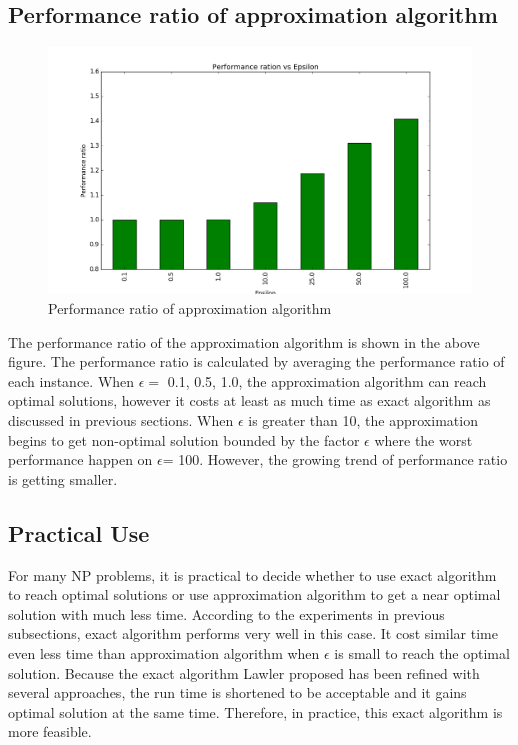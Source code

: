 \documentclass[11pt]{article}
\begin{document}
\subsection{Performance ratio of approximation algorithm}
\begin{figure}[H]
\hspace*{-1cm} 
    \label{fig:runtime} %
    \includegraphics[width=1.2\textwidth]{performance_ratio.png}
	\caption{Performance ratio of approximation algorithm}
\end{figure}
The performance ratio of the approximation algorithm is shown in the above figure. The performance ratio is calculated by averaging the performance ratio of each instance. When $\epsilon=$ 0.1, 0.5, 1.0, the approximation algorithm can reach optimal solutions, however it costs at least as much time as exact algorithm as discussed in previous sections.  When $\epsilon$ is greater than 10, the approximation begins to get non-optimal solution bounded by the factor $\epsilon$ where the worst performance happen on  $\epsilon$= 100. However, the growing trend of performance ratio is getting smaller.
\subsection{Practical Use}For many NP problems, it is practical to decide whether to use exact algorithm to reach  optimal solutions or use approximation algorithm to get a near optimal solution with much less time. According to the experiments in previous subsections, exact algorithm performs very well in this case. It cost similar time even less time than approximation algorithm when $\epsilon$ is small to reach the optimal solution. Because the exact algorithm Lawler proposed has been refined with several approaches, the run time is shortened to be acceptable and it gains optimal solution at the same time. Therefore, in practice, this exact algorithm is more feasible.
\nocite{*}


\end{document}
